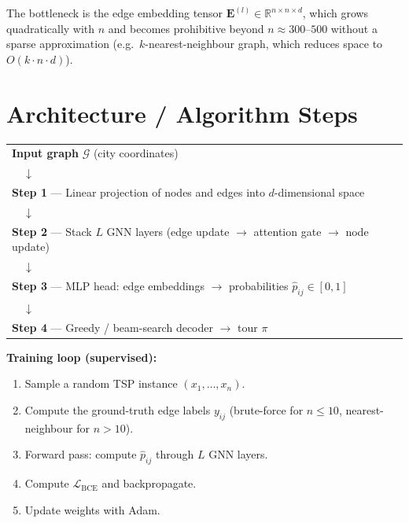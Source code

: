 \documentclass[12pt,a4paper]{article}
\begin{document}
The bottleneck is the edge embedding tensor
$\mathbf{E}^{(l)} \in \mathbb{R}^{n \times n \times d}$,
which grows quadratically with $n$ and becomes prohibitive beyond
$n \approx 300$--$500$ without a sparse approximation
(e.g.\ $k$-nearest-neighbour graph, which reduces space to $O(k \cdot n \cdot d)$).

\section{Architecture / Algorithm Steps}

\begin{center}
\begin{tabular}{l}
\textbf{Input graph} $\mathcal{G}$ (city coordinates)\\
$\quad\downarrow$\\
\textbf{Step 1} --- Linear projection of nodes and edges into $d$-dimensional space\\
$\quad\downarrow$\\
\textbf{Step 2} --- Stack $L$ GNN layers (edge update $\to$ attention gate $\to$ node update)\\
$\quad\downarrow$\\
\textbf{Step 3} --- MLP head: edge embeddings $\to$ probabilities $\hat{p}_{ij} \in [0,1]$\\
$\quad\downarrow$\\
\textbf{Step 4} --- Greedy / beam-search decoder $\to$ tour $\pi$\\
\end{tabular}
\end{center}

\textbf{Training loop (supervised):}
\begin{enumerate}[leftmargin=2em]
  \item Sample a random TSP instance $(x_1,\dots,x_n)$.
  \item Compute the ground-truth edge labels $y_{ij}$ (brute-force for $n \leq 10$,
    nearest-neighbour for $n > 10$).
  \item Forward pass: compute $\hat{p}_{ij}$ through $L$ GNN layers.
  \item Compute $\mathcal{L}_{\mathrm{BCE}}$ and backpropagate.
  \item Update weights with Adam.
\end{enumerate}
\end{document}
